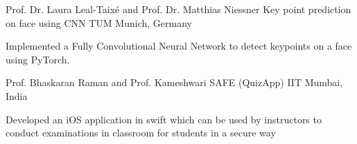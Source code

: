 \begin{cventries}
	\cventry
	{Prof. Dr. Laura Leal-Taixé and Prof. Dr. Matthias Niessner} %
	{Key point prediction on face using CNN} %
	{TUM Munich, Germany} %
	{} %
	{
		\begin{cvitems} %
			\item {Implemented a Fully Convolutional Neural Network to detect keypoints on a face using PyTorch.}
		\end{cvitems}
	}
	
	\cventry
	{Prof. Bhaskaran Raman and Prof. Kameshwari} %
	{SAFE (QuizApp)} %
	{IIT Mumbai, India} %
	{} %
	{
		\begin{cvitems} %
			\item {Developed an iOS application in swift which can be used by instructors to conduct examinations in classroom for students in a secure way}
		\end{cvitems}
	}
	

\end{cventries}
